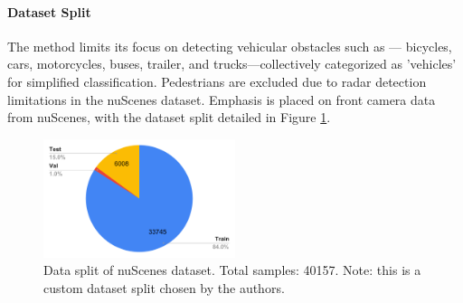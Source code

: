 \documentclass[report.tex]{subfiles}
\begin{document}



    \paragraph*{Dataset Split}
    The method limits its focus on detecting vehicular obstacles such as — bicycles, cars, motorcycles, buses, trailer, and trucks—collectively categorized as 'vehicles' for simplified classification. Pedestrians are excluded due to radar detection limitations in the nuScenes dataset. Emphasis is placed on front camera data from nuScenes, with the dataset split detailed in Figure \ref{fig:saffcos_data_split}.

    \begin{figure}[h!]
        \centering
        \includegraphics[width=0.5\textwidth]{images/methods/saf_fcos/data_split.pdf}
        \caption{Data split of nuScenes dataset. Total samples: 40157. Note: this is a custom dataset split chosen by the authors.}
        \label{fig:saffcos_data_split}
    \end{figure}
\end{document}
